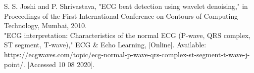 \documentclass[12pt]{article}
\begin{document}
\noindent[5] S. S. Joshi and P. Shrivastava, "ECG beat detection using wavelet denoising," in Proceedings of the First International Conference on Contours of Computing Technology, Mumbai, 2010.\\

\noindent[6] "ECG interpretation: Characteristics of the normal ECG (P-wave, QRS complex, ST segment, T-wave)," ECG \& Echo Learning, [Online]. Available:\\
https://ecgwaves.com/topic/ecg-normal-p-wave-qrs-complex-st-segment-t-wave-j-point/. [Accessed 10 08 2020].\\
\end{document}
